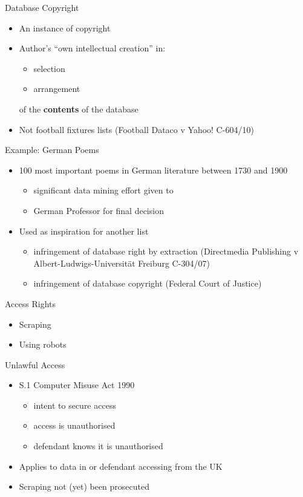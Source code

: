 \documentclass{beamer}
\begin{document}
\begin{frame}{Database Copyright}
  \begin{itemize}
  \item An instance of copyright
  \item Author's ``own intellectual creation'' in:
    \begin{itemize}
    \item selection
    \item arrangement
    \end{itemize}
of the {\bf contents} of the database
  \item Not football fixtures lists ({Football Dataco v Yahoo!} C-604/10)
  \end{itemize}
\end{frame}

\begin{frame}{Example: German Poems}
  \begin{itemize}
  \item 100 most important poems in German literature between
1730 and 1900
\begin{itemize}
\item significant data mining effort given to
\item German Professor for final decision
\end{itemize}
\item Used as inspiration for another list
  \begin{itemize}
  \item infringement of database right by extraction ({Directmedia Publishing v
  Albert-Ludwigs-Universität Freiburg} C-304/07)
\item infringement of database copyright (Federal Court of Justice)
  \end{itemize}
  \end{itemize}
\end{frame}

\begin{frame}{Access Rights}
  \begin{itemize}
  \item Scraping
  \item Using robots
  \end{itemize}
\end{frame}

\begin{frame}{Unlawful Access}
  \begin{itemize}
  \item S.1 Computer Misuse Act 1990
    \begin{itemize}
    \item intent to secure access
    \item access is unauthorised
    \item defendant knows it is unauthorised
    \end{itemize}
  \item Applies to data in or defendant accessing from the UK
  \item Scraping not (yet) been prosecuted
  \end{itemize}
  
\end{frame}
\end{document}
